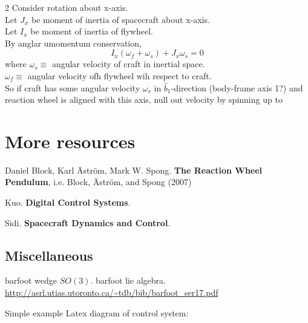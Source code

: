 \documentclass[10pt]{amsart}
\begin{document}
\begin{multicols*}{2}
Consider rotation about x-axis. \\
Let $J_x$ be moment of inertia of spacecraft about x-axis. \\
Let $I_x$ be moment of inertia of flywheel. \\
By anglar umomentum conservation,
\[
I_x(\omega_f + \omega_s) + J_x\omega_s = 0
\]
where $\omega_s \equiv $ angular velocity of craft in inertial space. \\
\phantom{where} $\omega_f \equiv$ angular velocity ofh flywheel wih respect to craft. \\

So if craft has some angular velocity $\omega_s$ in $\widehat{b}_1$-direction (body-frame axis 1?) and reaction wheel is aligned with this axis, null out velocity by spinning up to


\section{More resources}

Daniel Block, Karl \"{A}str\"{o}m, Mark W. Spong. \textbf{The Reaction Wheel Pendulum}, i.e. Block, \"{A}str\"{o}m, and Spong (2007) \cite{BAS2007}


Kuo. \textbf{Digital Control Systems}.

Sidi. \textbf{Spacecraft Dynamics and Control}.

\subsection{Miscellaneous}

barfoot wedge $SO(3)$. barfoot lie algebra. \url{http://asrl.utias.utoronto.ca/~tdb/bib/barfoot_ser17.pdf}

Simple example Latex diagram of control system:



\end{multicols*}
\end{document}
